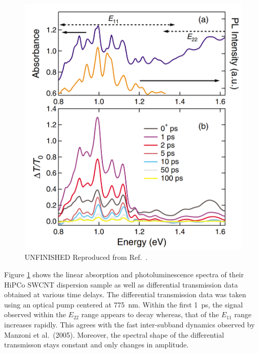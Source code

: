 \begin{figure}[ht]
	\centering
	\includegraphics[scale=0.22]{images/chapter_prior_works/abs_dtt_gordana_2005}
	\caption{{\color{red} UNFINISHED} Reproduced from Ref.\ \cite{ostojic2005stability}. }
	\label{fig:abs_dtt_gordana_2005}
\end{figure}

Figure \ref{fig:abs_dtt_gordana_2005} shows the linear absorption and photoluminescence spectra of their HiPCo SWCNT dispersion sample as well as differential transmission data obtained at various time delays. The differential transmission data was taken using an optical pump centered at \SI{775}{\nano\meter}. Within the first \SI{1}{\pico\second}, the signal observed within the $E_{22}$ range appears to decay whereas, that of the $E_{11}$ range increases rapidly. This agrees with the fast inter-subband dynamics observed by Manzoni et al.\ (2005). Moreover, the spectral shape of the differential transmisson stays constant and only changes in amplitude.


